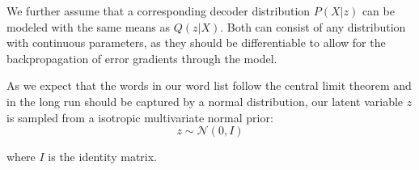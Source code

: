 \documentclass[6pt]{article}
\begin{document}
%
%
%
%
%
%

We further assume that a corresponding decoder distribution $P(X|z)$ can be modeled with the same means as $Q(z|X)$.  Both can consist of any distribution with continuous parameters, as they should be differentiable to allow for the backpropagation of error gradients through the model. 
%

As we expect that the words in our word list follow the central limit theorem and in the long run should be captured by a normal distribution, our latent variable $z$ is sampled from a isotropic multivariate normal prior:
\begin{equation}
z \sim \mathcal{N}(0,I)
\end{equation}

where $I$ is the identity matrix.
\end{document}
